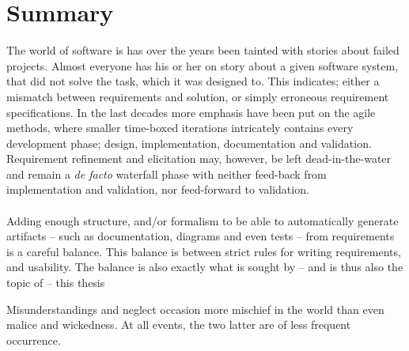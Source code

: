 \chapter{Summary}
The world of software is has over the years been tainted with stories about failed projects. Almost everyone has his or her on story about a given software system, that did not solve the task, which it was designed to. This indicates; either a mismatch between requirements and solution, or simply erroneous requirement specifications. In the last decades more emphasis have been put on the agile methods, where smaller time-boxed iterations intricately contains every development phase; design, implementation, documentation and validation. Requirement refinement and elicitation may, however, be left dead-in-the-water and remain a \emph{de facto} waterfall phase with neither feed-back from implementation and validation, nor feed-forward to validation.\\\\
Adding enough structure, and/or formalism to be able to automatically generate artifacts -- such as documentation, diagrams and even tests -- from requirements is a careful balance. This balance is between strict rules for writing requirements, and usability. The balance is also exactly what is sought by -- and is thus also the topic of --  this thesis
\newpage
\begin{fquote}Misunderstandings and neglect occasion more mischief in the world than even malice and wickedness. At all events, the two latter are of less frequent occurrence.
\end{fquote}